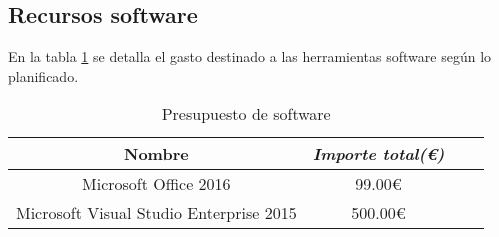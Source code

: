 \subsection{Recursos software}

En la tabla \ref{tab:budget-software} se detalla el gasto destinado a las herramientas software según lo planificado.

\begin{table}[htp]
	\centering
	\caption{Presupuesto de software}\label{tab:budget-software}
	\begin{tabular}{cccc}
		\toprule
    	\textbf{Nombre} & \emph{Importe total(\euro)}\\
    	\midrule
		Microsoft Office 2016					&	99.00€\\
		Microsoft Visual Studio Enterprise 2015	&	500.00€\\
    	\bottomrule
    \end{tabular}
\end{table}